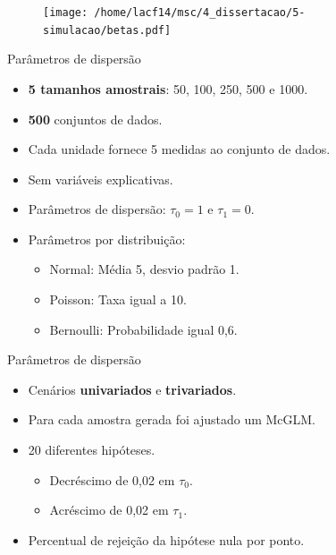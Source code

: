 \documentclass[
  ignorenonframetext,
  serif,
  professionalfont,
  usenames,
  dvipsnames,
  aspectratio = 169]{beamer}
\def\endColumns{\end{minipage}}%
\def\beginAHalfColumnT{\begin{minipage}[t]{0.49\textwidth}}%
\begin{document}
\begin{frame}{}
\protect\hypertarget{section}{}
\begin{figure}[H]
\centering
\texttt{[image: /home/lacf14/msc/4\_dissertacao/5-simulacao/betas.pdf]}
\end{figure}
\end{frame}

\begin{frame}{Parâmetros de dispersão}
\protect\hypertarget{paruxe2metros-de-dispersuxe3o}{}
\beginAHalfColumnT
  \begin{itemize}
    \itemsep 2ex
    \item \textbf{5 tamanhos amostrais}: 50, 100, 250, 500 e 1000.
  \item \textbf{500} conjuntos de dados.
  \item Cada unidade fornece 5 medidas ao conjunto de dados.
  \item Sem variáveis explicativas.
  \item Parâmetros de dispersão: $\tau_0 = 1$ e $\tau_1 = 0$.
\end{itemize}

\endColumns
\beginAHalfColumnT

\begin{itemize}
    \itemsep 2ex
    \item Parâmetros por distribuição:
    \begin{itemize}
        \item Normal: Média 5, desvio padrão 1.
        \item Poisson: Taxa igual a 10.
        \item Bernoulli: Probabilidade igual 0,6.
    \end{itemize}
  \end{itemize}
\endColumns
\end{frame}

\begin{frame}{Parâmetros de dispersão}
\protect\hypertarget{paruxe2metros-de-dispersuxe3o-1}{}
\begin{itemize}
  \itemsep 2ex
    \item Cenários \textbf{univariados} e \textbf{trivariados}.
    \item Para cada amostra gerada foi ajustado um McGLM.
  \item 20 diferentes hipóteses. 
    \begin{itemize}
      \item Decréscimo de 0,02 em $\tau_0$.
      \item Acréscimo de 0,02 em $\tau_1$.
    \end{itemize}

  \item Percentual de rejeição da hipótese nula por ponto. 

\end{itemize}
\end{frame}
\end{document}
